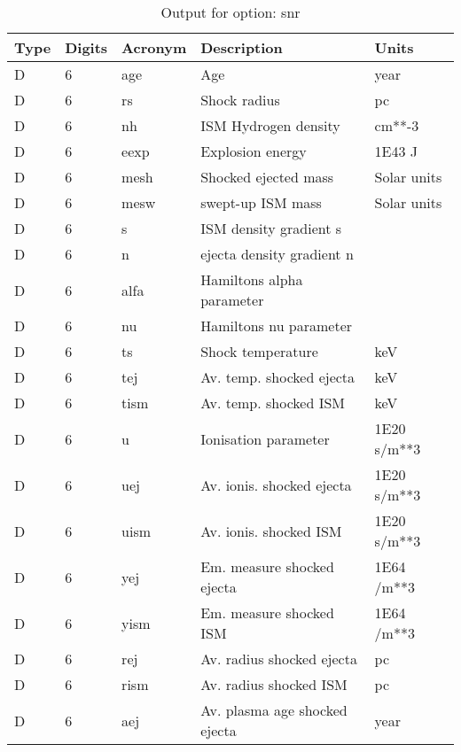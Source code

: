 \begin{table}[!p]
\caption{Output for option: snr}
\label{tabout:snr}
\begin{tabular}{lllll}
\hline
Type & Digits & Acronym & Description & Units \\ 
\hline
D &  6 & age  & Age                              & year             \\
D &  6 & rs   & Shock radius                     & pc               \\
D &  6 & nh   & ISM Hydrogen density             & cm**-3           \\
D &  6 & eexp & Explosion energy                 & 1E43 J           \\
D &  6 & mesh & Shocked ejected mass             & Solar units      \\
D &  6 & mesw & swept-up ISM mass                & Solar units      \\
D &  6 & s    & ISM density gradient s           &                  \\
D &  6 & n    & ejecta density gradient n        &                  \\
D &  6 & alfa & Hamiltons alpha parameter        &                  \\
D &  6 & nu   & Hamiltons nu parameter           &                  \\
D &  6 & ts   & Shock temperature                & keV              \\
D &  6 & tej  & Av. temp. shocked ejecta         & keV              \\
D &  6 & tism & Av. temp. shocked ISM            & keV              \\
D &  6 & u    & Ionisation parameter             & 1E20 s/m**3      \\
D &  6 & uej  & Av. ionis. shocked ejecta        & 1E20 s/m**3      \\
D &  6 & uism & Av. ionis. shocked ISM           & 1E20 s/m**3      \\
D &  6 & yej  & Em. measure shocked ejecta       & 1E64 /m**3       \\
D &  6 & yism & Em. measure shocked ISM          & 1E64 /m**3       \\
D &  6 & rej  & Av. radius shocked ejecta        & pc               \\
D &  6 & rism & Av. radius shocked ISM           & pc               \\
D &  6 & aej  & Av. plasma age shocked ejecta    & year             \\

\end{tabular}
\end{table}
